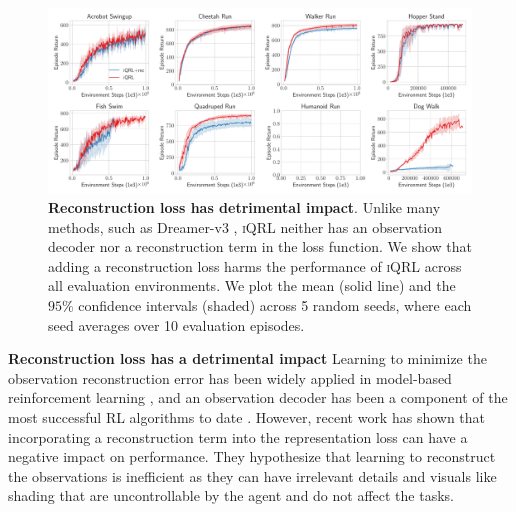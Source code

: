 \documentclass{article}
\theoremstyle{plain}
\theoremstyle{definition}
\theoremstyle{remark}
\newcommand{\our}{\textsc{iQRL}\xspace}
\begin{document}
\begin{figure}[ht]
	\vskip 0.2in
	\begin{center}
		\centerline{\includegraphics[width=1.0\textwidth]{./figs/reconstruction-loss-ablation.pdf}}
		\caption{\textbf{Reconstruction loss has detrimental impact}. Unlike many methods, such as Dreamer-v3 \cite{hafner2023mastering}, \our neither has an observation decoder nor a reconstruction term in the loss function. We show that adding a reconstruction loss harms the performance of \our across all evaluation environments. We plot the mean (solid line) and the $95\%$ confidence intervals (shaded) across 5 random seeds, where each seed averages over 10 evaluation episodes.}
		\label{fig:reconstruction-loss-ablation}
	\end{center}
	\vskip -0.2in
\end{figure}

\textbf{Reconstruction loss has a detrimental impact}
Learning to minimize the observation reconstruction error has been widely applied in model-based reinforcement learning \cite{sutton2018reinforcement, haRecurrentWorldModels2018, hafnerLearning2019}, and an observation decoder has been a component of the most successful RL algorithms to date \cite{hafner2023mastering}. However, recent work \citep{zhaoSimplifiedTemporalConsistency2023,hansenTemporalDifferenceLearning2022}
has shown that incorporating a reconstruction term into the representation loss can have a negative impact on performance. They hypothesize that learning to reconstruct the observations is inefficient as they can have irrelevant details and visuals like shading that are uncontrollable by the agent and do not affect the tasks.
\end{document}
